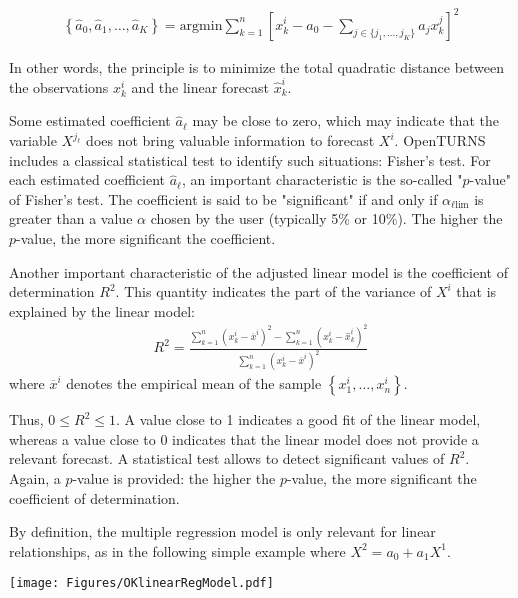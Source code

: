 {  \begin{align*}
    \left\{ \widehat{a}_0,\widehat{a}_1,\ldots,\widehat{a}_{K} \right\} = \textrm{argmin} \sum_{k=1}^n \left[ x^i_k - a_0 - \sum_{j \in \{ j_1,\ldots,j_K \} } a_j x^j_k \right]^2
  \end{align*}

  In other words, the principle is to minimize the total quadratic distance between the observations $x^i_k$ and the linear forecast $\widehat{x}^i_k$.

  Some estimated coefficient $\widehat{a}_\ell$ may be close to zero, which may indicate that the variable $X^{j_\ell}$ does not bring valuable information to forecast $X^i$. OpenTURNS includes a classical statistical test to identify such situations: Fisher's test.  For each estimated coefficient $\widehat{a}_\ell$, an important characteristic is the so-called "$p$-value" of Fisher's test. The coefficient is said to be "significant" if and only if $\alpha_{\ell \textrm{lim}}$ is greater than a value $\alpha$ chosen by the user (typically 5\% or 10\%). The higher the $p$-value, the more significant the coefficient.

  Another important characteristic of the adjusted linear model is the coefficient of determination $R^2$. This quantity indicates the part of the variance of $X^i$ that is explained by the linear model:
  \begin{align*}
    R^2 = \frac{ \displaystyle \sum_{k=1}^n \left( x^i_k - \overline{x}^i \right)^2 - \sum_{k=1}^n \left( x^i_k - \widehat{x}_k^i \right)^2 }{ \sum_{k=1}^n \left( x^i_k - \overline{x}^i \right)^2 }
  \end{align*}
  where $\overline{x}^i$ denotes the empirical mean of the sample $\left\{ x^i_1,\ldots,x^i_n  \right\}$.

  Thus, $0 \leq R^2 \leq 1$. A value close to 1 indicates a good fit of the linear model, whereas a value close to 0 indicates that the linear model does not provide a relevant forecast. A statistical test allows to detect significant values of $R^2$. Again, a $p$-value is provided: the higher the $p$-value, the more significant the coefficient of determination.

  By definition, the multiple regression model is only relevant for linear relationships, as in the following simple example where $X^2 = a_0 + a_1 X^1$.

  \begin{center}
    \texttt{[image: Figures/OKlinearRegModel.pdf]}
  \end{center}

}
